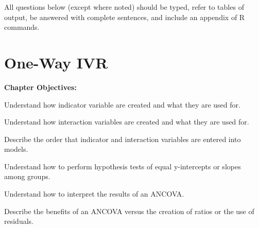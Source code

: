 \documentclass[10pt,openany]{book}\usepackage[]{graphicx}\usepackage[]{color}
\begin{document}
\begin{hwsection}{All questions below (except where noted) should be typed, refer to tables of output, be answered with complete sentences, and include an appendix of R commands.}
\end{hwsection}



\chapter{One-Way IVR}  \label{chap:LMRegression2}
  \vspace{0pt}
    \begin{ChapObj}{\boxwidth}
      \textbf{Chapter Objectives:}
        \begin{Enumerate}
          \item Understand how indicator variable are created and what they are used for.
          \item Understand how interaction variables are created and what they are used for.
          \item Describe the order that indicator and interaction variables are entered into models.
          \item Understand how to perform hypothesis tests of equal y-intercepts or slopes among groups.
          \item Understand how to interpret the results of an ANCOVA.
          \item Describe the benefits of an ANCOVA versus the creation of ratios or the use of residuals.
        \end{Enumerate}
    \end{ChapObj}

\minitoc
\newpage
\end{document}
